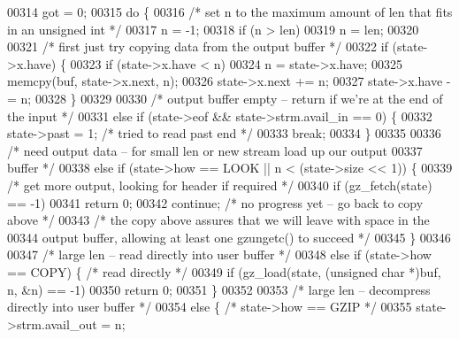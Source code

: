 \begin{DoxyCode}
00314     got = 0;
00315     \textcolor{keywordflow}{do} \{
00316         \textcolor{comment}{/* set n to the maximum amount of len that fits in an unsigned int */}
00317         n = -1;
00318         \textcolor{keywordflow}{if} (n > len)
00319             n = len;
00320 
00321         \textcolor{comment}{/* first just try copying data from the output buffer */}
00322         \textcolor{keywordflow}{if} (state->x.have) \{
00323             \textcolor{keywordflow}{if} (state->x.have < n)
00324                 n = state->x.have;
00325             memcpy(buf, state->x.next, n);
00326             state->x.next += n;
00327             state->x.have -= n;
00328         \}
00329 
00330         \textcolor{comment}{/* output buffer empty -- return if we're at the end of the input */}
00331         \textcolor{keywordflow}{else} \textcolor{keywordflow}{if} (state->eof && state->strm.avail\_in == 0) \{
00332             state->past = 1;        \textcolor{comment}{/* tried to read past end */}
00333             \textcolor{keywordflow}{break};
00334         \}
00335 
00336         \textcolor{comment}{/* need output data -- for small len or new stream load up our output}
00337 \textcolor{comment}{           buffer */}
00338         \textcolor{keywordflow}{else} \textcolor{keywordflow}{if} (state->how == LOOK || n < (state->size << 1)) \{
00339             \textcolor{comment}{/* get more output, looking for header if required */}
00340             \textcolor{keywordflow}{if} (gz\_fetch(state) == -1)
00341                 \textcolor{keywordflow}{return} 0;
00342             \textcolor{keywordflow}{continue};       \textcolor{comment}{/* no progress yet -- go back to copy above */}
00343             \textcolor{comment}{/* the copy above assures that we will leave with space in the}
00344 \textcolor{comment}{               output buffer, allowing at least one gzungetc() to succeed */}
00345         \}
00346 
00347         \textcolor{comment}{/* large len -- read directly into user buffer */}
00348         \textcolor{keywordflow}{else} \textcolor{keywordflow}{if} (state->how == COPY) \{      \textcolor{comment}{/* read directly */}
00349             \textcolor{keywordflow}{if} (gz\_load(state, (\textcolor{keywordtype}{unsigned} \textcolor{keywordtype}{char} *)buf, n, &n) == -1)
00350                 \textcolor{keywordflow}{return} 0;
00351         \}
00352 
00353         \textcolor{comment}{/* large len -- decompress directly into user buffer */}
00354         \textcolor{keywordflow}{else} \{  \textcolor{comment}{/* state->how == GZIP */}
00355             state->strm.avail\_out = n;

\end{DoxyCode}
